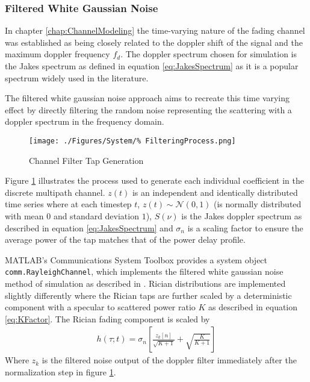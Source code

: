 \subsubsection{Filtered White Gaussian Noise}

In chapter \ref{chap:ChannelModeling} the time-varying nature of %
the fading channel was established as being closely related to the %
doppler shift of the signal and the maximum doppler frequency $f_d$. %
The doppler spectrum chosen for simulation is the Jakes spectrum as %
defined in equation \ref{eq:JakesSpectrum} as it is a popular spectrum %
widely used in the literature. %

The filtered white gaussian noise approach aims to recreate this %
time varying effect by directly filtering the random noise representing %
the scattering with a doppler spectrum in the frequency domain\cite{%
MIMO-OFDM10, Iskander}. 
\begin{figure}[ht]
	\texttt{[image: ./Figures/System/\%
	FilteringProcess.png]}
	\caption{Channel Filter Tap Generation}
	\label{fig:ChannelFilterSimulation}
\end{figure}
Figure \ref{fig:ChannelFilterSimulation} illustrates the process used %
to generate each individual coefficient in the discrete multipath channel. %
$z(t)$ is an independent and identically distributed time series where %
at each timestep $t$, $z(t)\sim\mathcal{N}(0,1)$ (is normally distributed %
with mean $0$ and standard deviation $1$), $S(\nu)$ is the Jakes doppler %
spectrum as described in equation \ref{eq:JakesSpectrum} and $\sigma_n$ is %
a scaling factor to ensure the average power of the tap matches that of the %
power delay profile.

MATLAB's Communications System Toolbox provides a system object %
\\\texttt{comm.RayleighChannel}, which implements the filtered %
white gaussian noise method of simulation as described in \cite{Iskander}. %
Rician distributions are implemented slightly differently where the Rician %
taps are further scaled by a deterministic component with a specular to %
scattered power ratio $K$ as described in equation \ref{eq:KFactor}. The %
Rician fading component is scaled by
\begin{align}
	h(\tau;t) = \sigma_n\left[ \frac{z_{k}\left[n\right]}{\sqrt{K + 1}} + 
	\sqrt{\frac{K}{K+1}}\right]
\end{align}
Where $z_{k}$ is the filtered noise output of the doppler filter \cite{Iskander} %
immediately after the normalization step in figure \ref{fig:ChannelFilterSimulation}.


